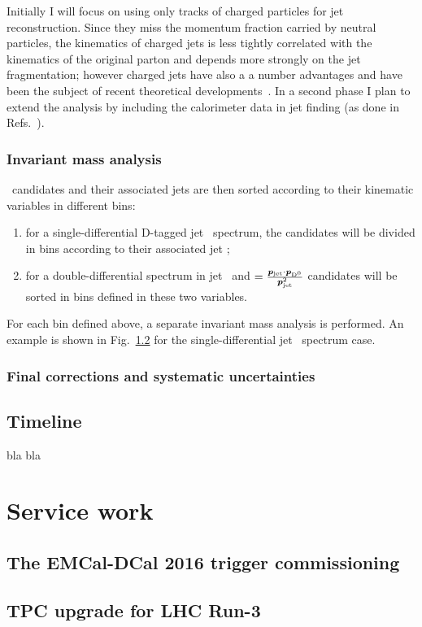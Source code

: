 \documentclass[12pt, a4paper, twoside, titlepage]{article}
\begin{document}

Initially I will focus on using only tracks of charged particles for jet reconstruction. Since they miss the momentum
fraction carried by neutral particles, the kinematics of charged jets is less tightly correlated with the kinematics
of the original parton and depends more strongly on the jet fragmentation; however charged jets have also a a number advantages
and have been the subject of recent theoretical developments~\cite{}.
In a second phase I plan to extend the analysis by including the calorimeter data in jet finding (as done in Refs.~\cite{}).

\subsubsection{Invariant mass analysis}
\Dzero\ candidates and their associated jets are then sorted according to their kinematic variables in different bins:
\begin{enumerate}
\item for a single-differential D-tagged jet \pt\ spectrum, the candidates will be divided in bins according to their associated jet \pt;
\item for a double-differential spectrum in jet \pt\ and \zpar$=\frac{\bm{p}_{\rm jet}\cdot{\bm{p}}_{\rm D^0}}{\bm{p}_{\rm jet}^2}$ candidates will
be sorted in bins defined in these two variables.
\end{enumerate}
For each bin defined above, a separate invariant mass analysis is performed. An example is shown in Fig.~\ref{} for the single-differential
jet \pt\ spectrum case. 

\subsubsection{Final corrections and systematic uncertainties}

\subsection{Timeline}
bla bla
\section{Service work}
\subsection{The EMCal-DCal 2016 trigger commissioning}
\label{sect:TriggerCommisioning}
\subsection{TPC upgrade for LHC Run-3}

{}

\end{document}

